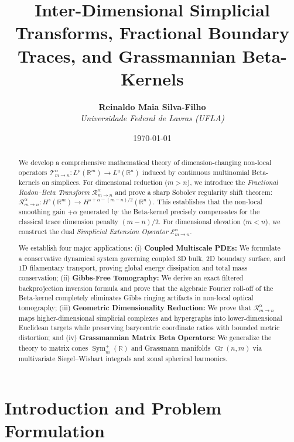 \documentclass[11pt,a4paper]{article}
\title{\textbf{Inter-Dimensional Simplicial Transforms, Fractional Boundary Traces, and Grassmannian Beta-Kernels}}
\author{\textbf{Reinaldo Maia Silva-Filho} \\ \textit{Universidade Federal de Lavras (UFLA)}}
\date{\today}
\theoremstyle{plain}
\theoremstyle{definition}
\theoremstyle{remark}
\numberwithin{equation}{section}
\begin{document}
\maketitle

\begin{abstract}
We develop a comprehensive mathematical theory of dimension-changing non-local operators $\mathcal{T}_{m \to n}^\alpha : L^p(\mathbb{R}^m) \to L^q(\mathbb{R}^n)$ induced by continuous multinomial Beta-kernels on simplices. For dimensional reduction ($m > n$), we introduce the \emph{Fractional Radon--Beta Transform} $\mathcal{R}_{m \to n}^\alpha$ and prove a sharp Sobolev regularity shift theorem: $\mathcal{R}_{m \to n}^\alpha : H^s(\mathbb{R}^m) \to H^{s + \alpha - (m-n)/2}(\mathbb{R}^n)$. This establishes that the non-local smoothing gain $+\alpha$ generated by the Beta-kernel precisely compensates for the classical trace dimension penalty $(m-n)/2$. For dimensional elevation ($m < n$), we construct the dual \emph{Simplicial Extension Operator} $\mathcal{E}_{m \to n}^\alpha$. 

We establish four major applications: (i) \textbf{Coupled Multiscale PDEs:} We formulate a conservative dynamical system governing coupled 3D bulk, 2D boundary surface, and 1D filamentary transport, proving global energy dissipation and total mass conservation; (ii) \textbf{Gibbs-Free Tomography:} We derive an exact filtered backprojection inversion formula and prove that the algebraic Fourier roll-off of the Beta-kernel completely eliminates Gibbs ringing artifacts in non-local optical tomography; (iii) \textbf{Geometric Dimensionality Reduction:} We prove that $\mathcal{R}_{m \to n}^\alpha$ maps higher-dimensional simplicial complexes and hypergraphs into lower-dimensional Euclidean targets while preserving barycentric coordinate ratios with bounded metric distortion; and (iv) \textbf{Grassmannian Matrix Beta Operators:} We generalize the theory to matrix cones $\operatorname{Sym}_m^+(\mathbb{R})$ and Grassmann manifolds $\operatorname{Gr}(n, m)$ via multivariate Siegel--Wishart integrals and zonal spherical harmonics.
\end{abstract}

\tableofcontents
\newpage

\section{Introduction and Problem Formulation}
\end{document}

